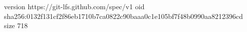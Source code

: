version https://git-lfs.github.com/spec/v1
oid sha256:0132f131cf2f86eb1710b7ca0822c90baaa0c1e105bf7f48b0990aa8212396cd
size 718

